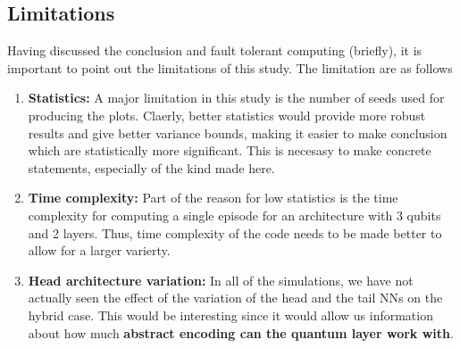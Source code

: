 \documentclass{article}
\begin{document}
\subsection{Limitations}
Having discussed the conclusion and fault tolerant computing (briefly), it is important to point out the limitations of this study. The limitation are as follows
\begin{enumerate}
    \item \textbf{Statistics:} A major limitation in this study is the number of seeds used for producing the plots. Claerly, better statistics would provide more robust results and give better variance bounds, making it easier to make conclusion which are statistically more significant. This is necesasy to make concrete statements, especially of the kind made here.
    \item \textbf{Time complexity:} Part of the reason for low statistics is the time complexity for computing a single episode for an architecture with 3 qubits and 2 layers. Thus, time complexity of the code needs to be made better to allow for a larger varierty.
    \item \textbf{Head architecture variation:} In all of the simulations, we have not actually seen the effect of the variation of the head and the tail NNs on the hybrid case. This would be interesting since it would allow us information about how much \textbf{abstract encoding can the quantum layer work with}\cite{}. 
\end{enumerate}
\end{document}
